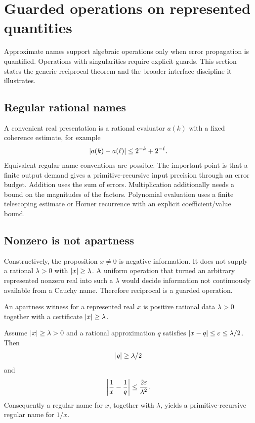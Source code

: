 \section{Guarded operations on represented quantities}
\label{sec:guarded}

Approximate names support algebraic operations only when error propagation is
quantified.  Operations with singularities require explicit guards.  This section
states the generic reciprocal theorem and the broader interface discipline it
illustrates.

\subsection{Regular rational names}

A convenient real presentation is a rational evaluator \(a(k)\) with a fixed
coherence estimate, for example
\[
  \lvert a(k)-a(\ell)\rvert\le2^{-k}+2^{-\ell}.
\]
Equivalent regular-name conventions are possible.  The important point is that a
finite output demand gives a primitive-recursive input precision through an error
budget.  Addition uses the sum of errors.  Multiplication additionally needs a bound
on the magnitudes of the factors.  Polynomial evaluation uses a finite telescoping
estimate or Horner recurrence with an explicit coefficient/value bound.

\subsection{Nonzero is not apartness}

Constructively, the proposition \(x\ne0\) is negative information.  It does not supply
a rational \(\lambda>0\) with \(\lvert x\rvert\ge\lambda\).  A uniform operation that turned
an arbitrary represented nonzero real into such a \(\lambda\) would decide information
not continuously available from a Cauchy name.  Therefore reciprocal is a guarded
operation.

\begin{definition}
An apartness witness for a represented real \(x\) is positive rational data
\(\lambda>0\) together with a certificate \(\lvert x\rvert\ge\lambda\).
\end{definition}

\begin{theorem}
\label{thm:guarded-reciprocal}
Assume \(\lvert x\rvert\ge\lambda>0\) and a rational approximation \(q\) satisfies
\(\lvert x-q\rvert\le\varepsilon\le\lambda/2\).  Then
\[
  \lvert q\rvert\ge\lambda/2
\]
and
\[
  \left|\frac1x-\frac1q\right|
  \le\frac{2\varepsilon}{\lambda^2}.
\]
Consequently a regular name for \(x\), together with \(\lambda\), yields a
primitive-recursive regular name for \(1/x\).
\end{theorem}


